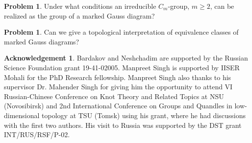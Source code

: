 \documentclass[11 pt, reqno]{amsart}
\theoremstyle{definition}
\newtheorem{problem}[theorem]{Problem}
\numberwithin{equation}{subsection}
\newtheorem*{ack}{Acknowledgement}
\begin{document}
\begin{problem}
Under what conditions an irreducible $C_m$-group, $m \geq 2$, can be realized as the group of a marked Gauss diagram?
\end{problem}

\begin{problem} 
Can we give a topological interpretation of equivalence classes of marked Gauss diagrams?
\end{problem}


\newpage
\begin{ack}
Bardakov and Neshchadim are supported by the Russian Science Foundation grant 19-41-02005. Manpreet Singh is supported by IISER Mohali for the PhD Research fellowship. Manpreet Singh also thanks to his supervisor Dr. Mahender Singh for giving him the opportunity to attend VI Russian-Chinese Conference on Knot Theory and Related Topics at NSU (Novosibirsk) and 2nd International Conference on Groups and Quandles in low-dimensional topology at TSU (Tomsk) using his grant, where he had discussions with the first two authors. His visit to Russia was supported by the DST grant INT/RUS/RSF/P-02.
\end{ack}
\end{document}
